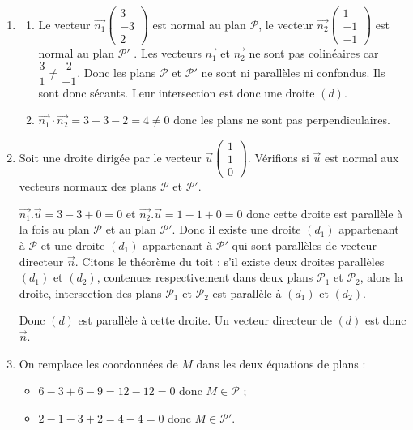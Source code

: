 \documentclass[10pt]{article}
\providecommand{\vect}[1]{\overrightarrow{#1}}
\begin{document}
\begin{enumerate}[resume]
	\item 
	\begin{enumerate}
		\item Le vecteur $\vect{n_1}\begin{pmatrix}3\\-3\\2\end{pmatrix}$ est normal au plan $\mathcal{P}$, le vecteur $\vect{n_2}\begin{pmatrix}1\\-1\\-1\end{pmatrix}$ est normal au plan $\mathcal{P}'$ . Les vecteurs $\vect{n_1}$ et $\vect{n_2}$ ne sont pas colinéaires car $\dfrac{3}{1}\neq \dfrac{2}{-1}$. Donc les plans $\mathcal{P}$ et $\mathcal{P}'$ ne sont ni parallèles ni confondus. Ils sont donc sécants. Leur intersection est donc une droite $(d)$.
		\item $\vect{n_1}\cdot \vect{n_2}=3+3-2=4\neq 0$ donc les plans ne sont pas perpendiculaires.
\end{enumerate}
	\item Soit une droite dirigée par le vecteur $\vect{u}\begin{pmatrix}1\\1\\0\end{pmatrix}$. Vérifions si $\vect{u}$ est normal aux vecteurs normaux des plans $\mathcal{P}$ et $\mathcal{P}'$.
	
	$\vect{n_1}.\vect{u}=3-3+0=0$ et $\vect{n_2}.\vect{u}=1-1+0=0$ donc cette droite est parallèle à la fois au plan $\mathcal{P}$ et au plan $\mathcal{P}'$. Donc il existe une droite $(d_1)$ appartenant à $\mathcal{P}$ et une droite $(d_1)$ appartenant à $\mathcal{P}'$ qui sont parallèles de vecteur directeur $\vect{n}$.
	Citons le théorème du toit : s'il existe deux droites parallèles $(d_1)$ et $(d_2)$, contenues respectivement dans deux plans $\mathcal{P}_1$ et $\mathcal{P}_2$, alors la droite, intersection des plans $\mathcal{P}_1$ et $\mathcal{P}_2$ est parallèle à $(d_1)$ et $(d_2)$.
	
Donc $(d)$ est parallèle à cette droite. Un vecteur directeur de $(d)$ est donc $\vect{n}$.
	\item On remplace les coordonnées de $M$ dans les deux équations de plans :
\begin{itemize}
\item $6-3+6-9=12-12=0$ donc $M\in \mathcal{P}$ ;
\item $2-1-3+2=4-4=0$ donc $M\in \mathcal{P}'$.
\end{itemize}


\end{enumerate}
\end{document}
